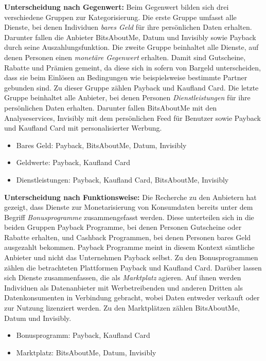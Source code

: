 \noindent \textbf{Unterscheidung nach Gegenwert:} Beim Gegenwert bilden sich drei verschiedene Gruppen zur Kategorisierung. Die erste Gruppe umfasst alle Dienste, bei denen Individuen \textit{bares Geld} für ihre persönlichen Daten erhalten. Darunter fallen die Anbieter BitsAboutMe, Datum und Invisibly sowie Payback durch seine Auszahlungsfunktion. Die zweite Gruppe beinhaltet alle Dienste, auf denen Personen einen \textit{monetäre Gegenwert} erhalten. Damit sind Gutscheine, Rabatte und Prämien gemeint, da diese sich in sofern von Bargeld unterscheiden, dass sie beim Einlösen an Bedingungen wie beispielsweise bestimmte Partner gebunden sind. Zu dieser Gruppe zählen Payback und Kaufland Card. Die letzte Gruppe beinhaltet alle Anbieter, bei denen Personen \textit{Dienstleistungen} für ihre persönlichen Daten erhalten. Darunter fallen BitsAboutMe mit den Analyseservices, Invisibly mit dem persönlichen Feed für Benutzer sowie Payback und Kaufland Card mit personalisierter Werbung.
\begin{itemize}
    \item Bares Geld: Payback, BitsAboutMe, Datum, Invisibly
    \item Geldwerte: Payback, Kaufland Card
    \item Dienstleistungen: Payback, Kaufland Card, BitsAboutMe, Invisibly
\end{itemize}

\noindent \textbf{Unterscheidung nach Funktionsweise:} Die Recherche zu den Anbietern hat gezeigt, dass Dienste zur Monetarisierung von Konsumdaten bereits unter dem Begriff \textit{Bonusprogramme} zusammengefasst werden. Diese unterteilen sich in die beiden Gruppen Payback Programme, bei denen Personen Gutscheine oder Rabatte erhalten, und Cashback Programmen, bei denen Personen bares Geld ausgezahlt bekommen. Payback Programme meint in diesem Kontext sämtliche Anbieter und nicht das Unternehmen Payback selbst. Zu den Bonusprogrammen zählen die betrachteten Plattformen Payback und Kaufland Card. Darüber lassen sich Dienste zusammenfassen, die als \textit{Marktplatz} agieren. Auf ihnen werden Individuen als Datenanbieter mit Werbetreibenden und anderen Dritten als Datenkonsumenten in Verbindung gebracht, wobei Daten entweder verkauft oder zur Nutzung lizenziert werden. Zu den Marktplätzen zählen BitsAboutMe, Datum und Invisibly.
\begin{itemize}
    \item Bonusprogramm: Payback, Kaufland Card
    \item Marktplatz: BitsAboutMe, Datum, Invisibly
\end{itemize}

